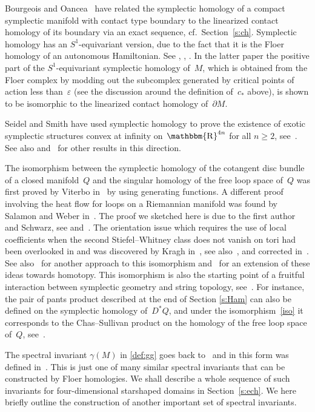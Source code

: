 \documentclass[12pt,twoside]{amsart}
\theoremstyle{plain}
\numberwithin{figure}{section}
\numberwithin{equation}{section}
\def\eps{\varepsilon}
\def\gg{\gamma}
\def\R{\operatorname{\mathbbm{R}}}
\begin{document}
Bourgeois and Oancea~\cite{bo09b} have related the symplectic homology of a compact symplectic manifold with contact type boundary to the linearized contact homology 
of its boundary via an exact sequence, cf.\ Section~\ref{s:ch}.
Symplectic homology has an $S^1$-equivariant version, due to the fact that it is the Floer homology of an autonomous Hamiltonian. 
See \cite[\S 5]{vit99}, \cite{sei08}, \cite{bo13}. 
In the latter paper the positive part of the $S^1$-equivariant symplectic homology of~$M$, 
which is obtained from the Floer complex by modding out the subcomplex generated by critical points of action 
less than~$\eps$ (see the discussion around the definition of~$c_*$ above), 
is shown to be isomorphic to the linearized contact homology of~$\partial M$.

Seidel and Smith have used symplectic homology to prove the existence of exotic symplectic structures 
convex at infinity on~$\R^{4n}$ for all $n \geqslant 2$, 
see~\cite{ss05}. See also \cite{mcl09} and~\cite{sei11} for other results in this direction. 

The isomorphism between the symplectic homology of the cotangent disc bundle of a 
closed manifold~$Q$ and the singular homology of the free loop space of~$Q$ 
was first proved by Viterbo in~\cite{vit03} by using generating functions. 
A different proof involving the heat flow for loops on a Riemannian manifold was found by Salamon and Weber in~\cite{sw06}. 
The proof we sketched here is due to the first author and Schwarz, 
see \cite{as06} and~\cite{as15}. 
The orientation issue which requires the use of local coefficients when the second Stiefel--Whitney class does not vanish on tori had been overlooked in \cite{vit03,sw06,as06} 
and was discovered by Kragh in~\cite{kra07}, see also~\cite{kra13}, 
and corrected in~\cite{as14,as15}. 
See also~\cite{abo15} for another approach to this isomorphism and~\cite{coh10} for an extension of these ideas towards homotopy. 
This isomorphism is also the starting point of a fruitful interaction between symplectic geometry and string topology, see~\cite{as10,cl09}.
For instance, the pair of pants product described at the end of Section \ref{s:Ham}
can also be defined on the symplectic homology of~$D^*Q$,
and under the isomorphism~\eqref{iso} it corresponds to the Chas--Sullivan product on 
the homology of the free loop space of~$Q$, see~\cite{as10}. 

The spectral invariant $\gg (M)$ in \eqref{def:gg} goes back to~\cite{fhw94}
and in this form was defined in~\cite{vit99}.
This is just one of many similar spectral invariants that can be
constructed by Floer homologies.
We shall describe a whole sequence of such invariants 
for four-dimensional starshaped domains in Section~\ref{s:ech}.
%
We here briefly outline the construction of another important set of spectral invariants.
\end{document}

